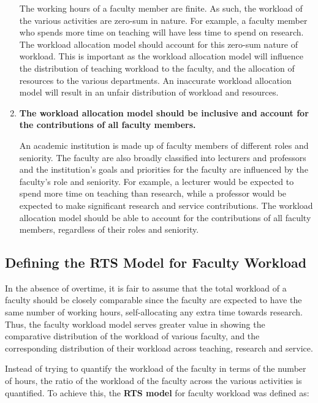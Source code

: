 \begin{enumerate}
        The working hours of a faculty member are finite. As such, the workload of the various activities are zero-sum in nature. For example, a faculty member who spends more time on teaching will have less time to spend on research. The workload allocation model should account for this zero-sum nature of workload. This is important as the workload allocation model will influence the distribution of teaching workload to the faculty, and the allocation of resources to the various departments. An inaccurate workload allocation model will result in an unfair distribution of workload and resources.

  \item \textbf{The workload allocation model should be inclusive and account for the contributions of all faculty members.}

        An academic institution is made up of faculty members of different roles and seniority. The faculty are also broadly classified into lecturers and professors and the institution's goals and priorities for the faculty are influenced by the faculty's role and seniority. For example, a lecturer would be expected to spend more time on teaching than research, while a professor would be expected to make significant research and service contributions. The workload allocation model should be able to account for the contributions of all faculty members, regardless of their roles and seniority.

\end{enumerate}

\subsection{Defining the RTS Model for Faculty Workload}

In the absence of overtime, it is fair to assume that the total workload of a faculty should be closely comparable since the faculty are expected to have the same number of working hours, self-allocating any extra time towards research. Thus, the faculty workload model serves greater value in showing the comparative distribution of the workload of various faculty, and the corresponding distribution of their workload across teaching, research and service.

Instead of trying to quantify the workload of the faculty in terms of the number of hours, the ratio of the workload of the faculty across the various activities is quantified. To achieve this, the \textbf{RTS model} for faculty workload was defined as:

